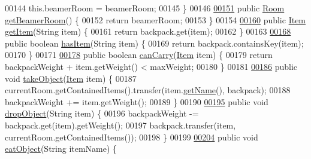 \begin{DoxyCode}
00144         this.beamerRoom = beamerRoom;
00145     \}
00146 
\hypertarget{Player_8java_source_l00151}{}\hyperlink{classPlayer_a9114998742351bf793e093cb198993ca}{00151}     \textcolor{keyword}{public} \hyperlink{classRoom}{Room} \hyperlink{classPlayer_a9114998742351bf793e093cb198993ca}{getBeamerRoom}() \{
00152         \textcolor{keywordflow}{return} beamerRoom;
00153     \}
00154 
\hypertarget{Player_8java_source_l00160}{}\hyperlink{classPlayer_a8c183303976b4ea5d0c10fdbff14e4a1}{00160}     \textcolor{keyword}{public} \hyperlink{classItem}{Item} \hyperlink{classPlayer_a8c183303976b4ea5d0c10fdbff14e4a1}{getItem}(String item) \{
00161         \textcolor{keywordflow}{return} backpack.get(item);
00162     \}
00163 
\hypertarget{Player_8java_source_l00168}{}\hyperlink{classPlayer_a90cb3f05b491eaed668fe54b9258b755}{00168}     \textcolor{keyword}{public} \textcolor{keywordtype}{boolean} \hyperlink{classPlayer_a90cb3f05b491eaed668fe54b9258b755}{hasItem}(String item) \{
00169         \textcolor{keywordflow}{return} backpack.containsKey(item);
00170     \}
00171 
\hypertarget{Player_8java_source_l00178}{}\hyperlink{classPlayer_ad84aab6c7b6ed8d58608adf0484f0268}{00178}     \textcolor{keyword}{public} \textcolor{keywordtype}{boolean} \hyperlink{classPlayer_ad84aab6c7b6ed8d58608adf0484f0268}{canCarry}(\hyperlink{classItem}{Item} item) \{
00179         \textcolor{keywordflow}{return} backpackWeight + item.getWeight() < maxWeight;
00180     \}
00181 
\hypertarget{Player_8java_source_l00186}{}\hyperlink{classPlayer_a256305370cf457a32791d68c73e0b236}{00186}     \textcolor{keyword}{public} \textcolor{keywordtype}{void} \hyperlink{classPlayer_a256305370cf457a32791d68c73e0b236}{takeObject}(\hyperlink{classItem}{Item} item) \{
00187         currentRoom.getContainedItems().transfer(item.\hyperlink{classItem_a78dd5a8370c5267c3f1f992167ab84ac}{getName}(), backpack);
00188         backpackWeight += item.getWeight();
00189     \}
00190 
\hypertarget{Player_8java_source_l00195}{}\hyperlink{classPlayer_a4fbdbd407197f43f4f7beca517182765}{00195}     \textcolor{keyword}{public} \textcolor{keywordtype}{void} \hyperlink{classPlayer_a4fbdbd407197f43f4f7beca517182765}{dropObject}(String item) \{
00196         backpackWeight -= backpack.get(item).getWeight();
00197         backpack.transfer(item, currentRoom.getContainedItems());
00198     \}
00199 
\hypertarget{Player_8java_source_l00204}{}\hyperlink{classPlayer_a83141dd7c002b30a6e19b884daf26e8c}{00204}     \textcolor{keyword}{public} \textcolor{keywordtype}{void} \hyperlink{classPlayer_a83141dd7c002b30a6e19b884daf26e8c}{eatObject}(String itemName) \{

\end{DoxyCode}
